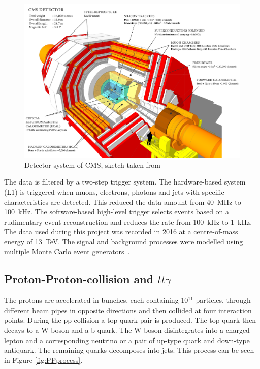 \documentclass[11pt]{scrartcl}
\begin{document}
	\begin{figure}[H]
	\centering
	\includegraphics[width=1\textwidth]{figures/detector_system.png}
	\caption{Detector system of CMS, sketch taken from~\cite{CMSWEB}}
	\label{fig:detectorsystem}
	\end{figure}
	
	The data is filtered by a two-step trigger system. The hardware-based system (L1) is triggered when muons, electrons, photons and jets with specific characteristics are detected. This reduced the data amount from 40~MHz to 100~kHz. The software-based high-level trigger selects events based on a rudimentary event reconstruction and reduces the rate from 100~kHz to 1~kHz. The data used during this project was recorded in 2016 at a centre-of-mass energy of 13~TeV. The signal and background processes were modelled using multiple Monte Carlo event generators~\cite{CMS21}. 

	\subsection{Proton-Proton-collision and $t\overline{t}\gamma$}
	 \label{sec:PPprocess}
	The protons are accelerated in bunches, each containing 10$^{11}$ particles, through different beam pipes in opposite directions and then collided at four interaction points. During the pp collision a top quark pair is produced. The top quark then decays to a W-boson and a b-quark. The W-boson disintegrates into a charged lepton and a corresponding neutrino or a pair of up-type quark and down-type antiquark. The remaining quarks decomposes into jets. This process can be seen in Figure \ref{fig:PPprocess}.
	
\end{document}
